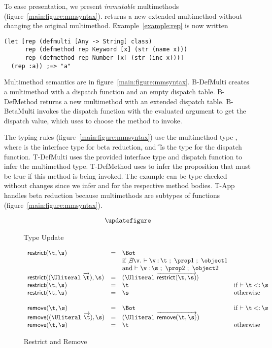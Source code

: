 To ease presentation, we present \emph{immutable}
multimethods (figure~\ref{main:figure:mmsyntax}).  returns a new extended multimethod
without changing the original multimethod. Example~\ref{example:rep} is now written
\begin{verbatim}
(let [rep (defmulti [Any -> String] class)
      rep (defmethod rep Keyword [x] (str (name x)))
      rep (defmethod rep Number [x] (str (inc x)))]
  (rep :a)) ;=> "a"
\end{verbatim}

Multimethod semantics are in figure~\ref{main:figure:mmsyntax}.
B-DefMulti creates a multimethod with a dispatch function and an empty dispatch table.
B-DefMethod returns a new multimethod with an extended dispatch table.
B-BetaMulti invokes the dispatch function with the evaluated argument to get the dispatch value,
which \getmethodliteral{} uses to choose the method to invoke.

The typing rules (figure~\ref{main:figure:mmsyntax}) use the multimethod type {\MultiFntype{\s{}}{\t{}}}, 
where \s{} is the interface type for beta reduction, and \t{} is the type for
the dispatch function. T-DefMulti uses the provided interface type and dispatch function
to infer the multimethod type. T-DefMethod uses \isacompareliteral{} to infer the proposition
that must be true if this method is being invoked. The example can be type checked without
changes since we infer \isprop{\Number}{\x{}} and \isprop{\Keyword}{\x{}} for the respective
method bodies. T-App handles beta reduction because multimethods are subtypes of functions
(figure~\ref{main:figure:mmsyntax}).



\begin{figure*}
  $$
\begin{array}{lllll}
\updatefigure
\end{array}
$$
\caption{Type Update}
\label{main:figure:update}
\end{figure*}

{}

\begin{figure}
  $$
\begin{array}{lllll}
  \restrictremovefigure{}
\end{array}
  $$
  \caption{Restrict and Remove}
  \label{main:figure:restrictremove}
\end{figure}
